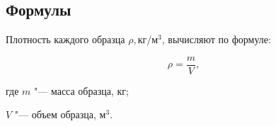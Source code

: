 \subsection{Формулы}

Плотность каждого образца $\rho, \text{кг}/\text{м}^3$,
вычисляют по формуле:

\begin{equation}
\label{eq:1}
\rho = \frac{m}{V},
\end{equation}
\begin{ESKDexplanation}
\item[где ] $m$ "--- масса образца, кг;
\item $V$ "--- объем образца, $\text{м}^3$.
\end{ESKDexplanation}



